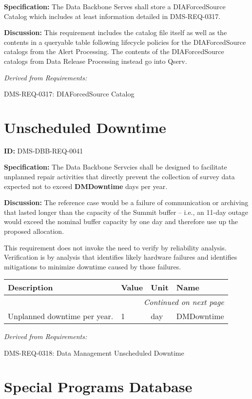 \documentclass[SE,toc,lsstdraft]{lsstdoc}
\makeatletter
\newcommand{\paramname}[1]{\hspace{0pt}#1}
\newcommand{\unitname}[1]{\hspace{0pt}#1}
\newenvironment{parameters}[0]{%
\setlength\LTleft{0pt}
\setlength\LTright{\fill}
\begin{small}
\begin{longtable}[]{|p{0.49\textwidth}|l|p{0.6in}|p{1.70in}@{}|}

\hline \textbf{Description} & \textbf{Value} & \textbf{Unit} & \textbf{Name} \\ \hline
\endhead

\hline \multicolumn{4}{r}{\emph{Continued on next page}} \\
\endfoot

\hline\hline
\endlastfoot
}{%
\hline
\end{longtable}
\end{small}
}
\makeatother
\begin{document}
\textbf{Specification:}
The Data Backbone Serves shall store a DIAForcedSource Catalog which includes at least information detailed in DMS-REQ-0317.

\textbf{Discussion:}
This requirement includes the catalog file itself as well as the contents in a queryable table following lifecycle policies for the DIAForcedSource catalogs from the Alert Processing.  The contents of the DIAForcedSource catalogs from Data Release Processing instead go into Qserv.

\emph{Derived from Requirements:}

DMS-REQ-0317:
DIAForcedSource Catalog \newline

\section{Unscheduled Downtime}

\label{DMS-DBB-REQ-0041}
\textbf{ID:} DMS-DBB-REQ-0041

\textbf{Specification:}
The Data Backbone Servcies shall be designed to facilitate unplanned repair activities that directly prevent the collection of survey data expected not to exceed \textbf{DMDowntime} days per year.

\textbf{Discussion:}
The reference case would be a failure of communication or archiving that lasted longer than the capacity of the Summit buffer -- i.e., an 11-day outage would exceed the nominal buffer capacity by one day and therefore use up the proposed allocation.

This requirement does not invoke the need to verify by reliability analysis. Verification is by analysis that identifies likely hardware failures and identifies mitigations to minimize downtime caused by those failures.

\begin{parameters}
Unplanned downtime per year.
&
1
&
\unitname{%
day
}
&
\paramname{%
DMDowntime
} \\\hline
\end{parameters}

\emph{Derived from Requirements:}

DMS-REQ-0318:
Data Management Unscheduled Downtime \newline

\section{Special Programs Database}
\end{document}
